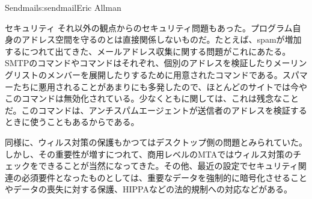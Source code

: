 \begin{aosachapter}{Sendmail}{s:sendmail}{Eric Allman}
\begin{aosasect1}{セキュリティ}
それ以外の観点からのセキュリティ問題もあった。プログラム自身のアドレス空間を守るのとは直接関係しないものだ。たとえば、spamが増加するにつれて出てきた、メールアドレス収集に関する問題がこれにあたる。SMTPのコマンドやコマンドはそれぞれ、個別のアドレスを検証したりメーリングリストのメンバーを展開したりするために用意されたコマンドである。スパマーたちに悪用されることがあまりにも多発したので、ほとんどのサイトでは今やこのコマンドは無効化されている。少なくともに関しては、これは残念なことだ。このコマンドは、アンチスパムエージェントが送信者のアドレスを検証するときに使うこともあるからである。

同様に、ウィルス対策の保護もかつてはデスクトップ側の問題とみられていた。しかし、その重要性が増すにつれて、商用レベルのMTAではウィルス対策のチェックをできることが当然になってきた。その他、最近の設定でセキュリティ関連の必須要件となったものとしては、重要なデータを強制的に暗号化させることやデータの喪失に対する保護、HIPPAなどの法的規制への対応などがある。


\end{aosasect1}
\end{aosachapter}
